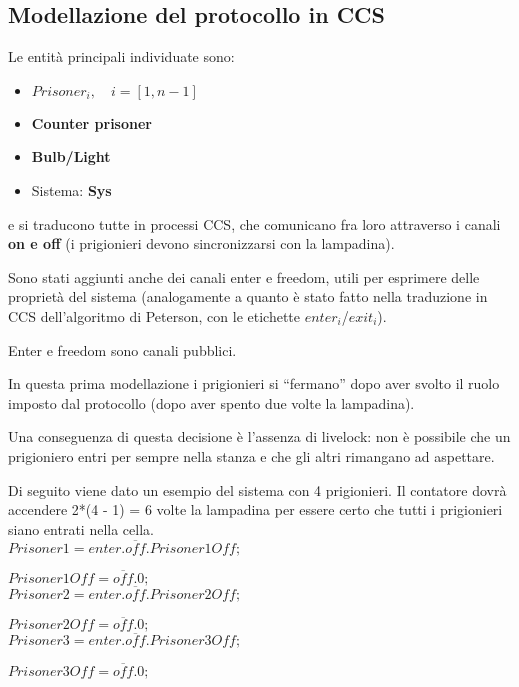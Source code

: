 \subsection{Modellazione del protocollo in CCS}

Le entità principali individuate sono:

\begin{itemize}
\item $Prisoner_i, \quad i = [1, n-1]$
\item \textbf{Counter prisoner}
\item \textbf{Bulb/Light}
\item Sistema: \textbf{Sys}
\end{itemize}

e si traducono tutte in processi CCS, che comunicano fra loro attraverso i
canali \textbf{on e off} (i prigionieri devono sincronizzarsi con la lampadina).

Sono stati aggiunti anche dei canali enter e freedom, utili per esprimere delle
proprietà del sistema (analogamente a quanto è stato fatto nella traduzione in
CCS dell'algoritmo di Peterson, con le etichette $enter_i$/$exit_i$).

Enter e freedom sono canali pubblici.

In questa prima modellazione i prigionieri si ``fermano'' dopo aver svolto il ruolo
imposto dal protocollo (dopo aver spento due volte la lampadina).

Una conseguenza di questa decisione è l'assenza di livelock: non è possibile che un
prigioniero entri per sempre nella stanza e che gli altri rimangano ad aspettare.

Di seguito viene dato un esempio del sistema con 4 prigionieri.
Il contatore dovrà accendere 2*(4 - 1) = 6 volte la lampadina per essere certo che tutti
i prigionieri siano entrati nella cella. \\

$Prisoner1 = enter.\overline{off}.Prisoner1Off;$

$Prisoner1Off = \overline{off}.0;$ \\

$Prisoner2 = enter.\overline{off}.Prisoner2Off;$

$Prisoner2Off = \overline{off}.0;$ \\

$Prisoner3 = enter.\overline{off}.Prisoner3Off;$

$Prisoner3Off = \overline{off}.0;$ \\


